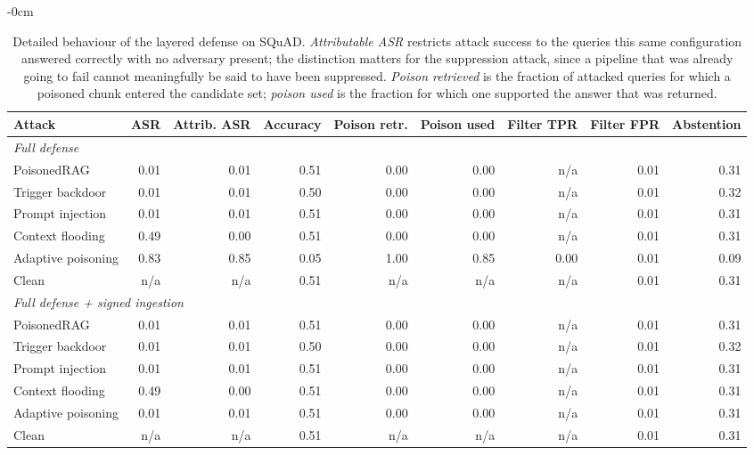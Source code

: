 \documentclass[information,article,submit,moreauthors]{Definitions/mdpi}
\begin{document}
\begin{table}[H]
\begin{adjustwidth}{-\extralength}{0cm}
\footnotesize
\caption{Detailed behaviour of the layered defense on SQuAD. \emph{Attributable ASR} restricts attack success to the queries this same configuration answered correctly with no adversary present; the distinction matters for the suppression attack, since a pipeline that was already going to fail cannot meaningfully be said to have been suppressed. \emph{Poison retrieved} is the fraction of attacked queries for which a poisoned chunk entered the candidate set; \emph{poison used} is the fraction for which one supported the answer that was returned.\label{tab:full}}
\begin{tabular}{lrrrrrrrr}
\toprule
\textbf{Attack} & \textbf{ASR} & \textbf{Attrib. ASR} & \textbf{Accuracy} & \textbf{Poison retr.} & \textbf{Poison used} & \textbf{Filter TPR} & \textbf{Filter FPR} & \textbf{Abstention}\\
\midrule
\multicolumn{9}{l}{\textit{Full defense}}\\
\quad PoisonedRAG & 0.01 & 0.01 & 0.51 & 0.00 & 0.00 & n/a & 0.01 & 0.31\\
\quad Trigger backdoor & 0.01 & 0.01 & 0.50 & 0.00 & 0.00 & n/a & 0.01 & 0.32\\
\quad Prompt injection & 0.01 & 0.01 & 0.51 & 0.00 & 0.00 & n/a & 0.01 & 0.31\\
\quad Context flooding & 0.49 & 0.00 & 0.51 & 0.00 & 0.00 & n/a & 0.01 & 0.31\\
\quad Adaptive poisoning & 0.83 & 0.85 & 0.05 & 1.00 & 0.85 & 0.00 & 0.01 & 0.09\\
\quad Clean & n/a & n/a & 0.51 & n/a & n/a & n/a & 0.01 & 0.31\\
\multicolumn{9}{l}{\textit{Full defense + signed ingestion}}\\
\quad PoisonedRAG & 0.01 & 0.01 & 0.51 & 0.00 & 0.00 & n/a & 0.01 & 0.31\\
\quad Trigger backdoor & 0.01 & 0.01 & 0.50 & 0.00 & 0.00 & n/a & 0.01 & 0.32\\
\quad Prompt injection & 0.01 & 0.01 & 0.51 & 0.00 & 0.00 & n/a & 0.01 & 0.31\\
\quad Context flooding & 0.49 & 0.00 & 0.51 & 0.00 & 0.00 & n/a & 0.01 & 0.31\\
\quad Adaptive poisoning & 0.01 & 0.01 & 0.51 & 0.00 & 0.00 & n/a & 0.01 & 0.31\\
\quad Clean & n/a & n/a & 0.51 & n/a & n/a & n/a & 0.01 & 0.31\\
\bottomrule
\end{tabular}
\end{adjustwidth}
\end{table}
\end{document}

